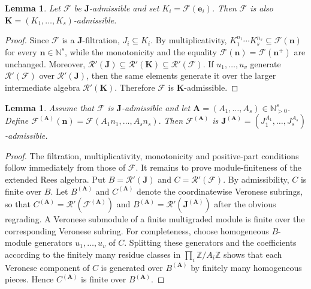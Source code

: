 \documentclass[reqno,12pt]{amsart}
\theoremstyle{plain}
\newtheorem{lem}[prop]{Lemma}
\theoremstyle{definition}
\theoremstyle{remark}
\newcommand{\N}{\mathbb N}
\numberwithin{equation}{section}
\begin{document}
\begin{lem}
\label{lem:change-base}
Let $\mathcal F$ be $\mathbf J$-admissible and set
$K_i=\mathcal F(\mathbf e_i)$. Then $\mathcal F$ is also
$\mathbf K=(K_1,\ldots,K_s)$-admissible.
\end{lem}

\begin{proof}
Since $\mathcal F$ is a $\mathbf J$-filtration,
$J_i\subseteq K_i$. By multiplicativity,
$K_1^{n_1}\cdots K_s^{n_s}\subseteq\mathcal F(\mathbf n)$ for every
$\mathbf n\in\N^s$, while the monotonicity and the equality
$\mathcal F(\mathbf n)=\mathcal F(\mathbf n^+)$ are unchanged. Moreover, $\mathcal R'(\mathbf J)
\subseteq\mathcal R'(\mathbf K)
\subseteq\mathcal R'(\mathcal F).$
If $u_1,\ldots,u_v$ generate $\mathcal R'(\mathcal F)$ over
$\mathcal R'(\mathbf J)$, then the same elements generate it over the
larger intermediate algebra $\mathcal R'(\mathbf K)$. Therefore
$\mathcal F$ is $\mathbf K$-admissible.
\end{proof}

\begin{lem}
\label{lem:veronese-admissible}
Assume that $\mathcal F$ is $\mathbf J$-admissible and let
$\mathbf A=(A_1,\ldots,A_s)\in\N_{>0}^s$. Define $\mathcal F^{(\mathbf A)}(\mathbf n)
=
\mathcal F(A_1n_1,\ldots,A_sn_s).$
Then $\mathcal F^{(\mathbf A)}$ is
$\mathbf J^{(\mathbf A)}=(J_1^{A_1},\ldots,J_s^{A_s})$-admissible.
\end{lem}

\begin{proof}
The filtration, multiplicativity, monotonicity and positive-part
conditions follow immediately from those of $\mathcal F$. It remains to
prove module-finiteness of the extended Rees algebra. Put $B=\mathcal R'(\mathbf J)$ and
$C=\mathcal R'(\mathcal F)$. By admissibility, $C$ is finite over $B$.
Let $B^{(\mathbf A)}$ and $C^{(\mathbf A)}$ denote the coordinatewise
Veronese subrings, so that
$C^{(\mathbf A)}=\mathcal R'(\mathcal F^{(\mathbf A)})$ and
$B^{(\mathbf A)}=\mathcal R'(\mathbf J^{(\mathbf A)})$ after the
obvious regrading. A Veronese submodule of a finite multigraded module is
finite over the corresponding Veronese subring. For completeness, choose
homogeneous $B$-module generators $u_1,\ldots,u_v$ of $C$. Splitting
these generators and the coefficients according to the finitely many
residue classes in
$\prod_i\mathbb Z/A_i\mathbb Z$ shows that each Veronese component of
$C$ is generated over $B^{(\mathbf A)}$ by finitely many homogeneous
pieces. Hence $C^{(\mathbf A)}$ is finite over $B^{(\mathbf A)}$.
\end{proof}
\end{document}
